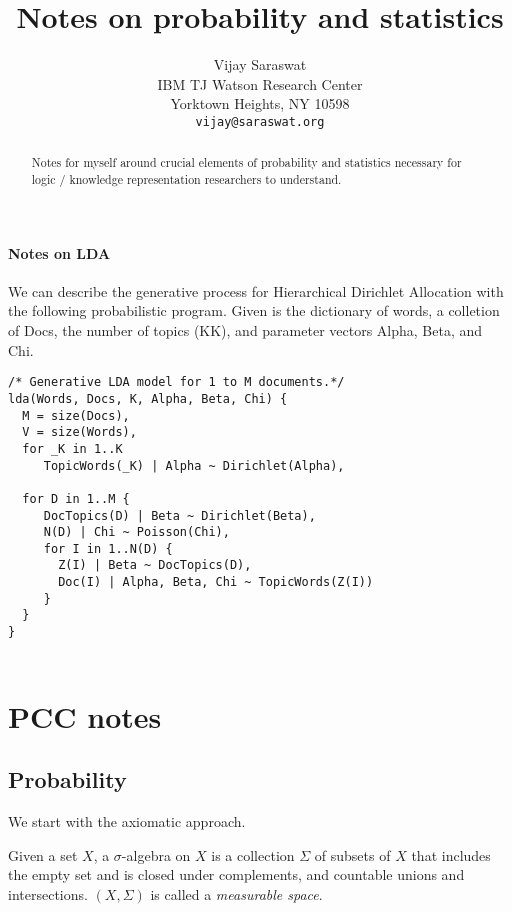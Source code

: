 \documentclass{article}
\title{Notes on probability and statistics}
\author{
  Vijay Saraswat \\
  IBM TJ Watson Research Center \\
  Yorktown Heights, NY 10598\\
  \texttt{vijay@saraswat.org} 
}
\begin{document}

\maketitle
\begin{abstract}
  Notes for myself around crucial elements of probability and statistics necessary for logic / knowledge representation researchers to understand.
\end{abstract}

\paragraph{Notes on LDA}

We can describe the generative process for Hierarchical Dirichlet Allocation with the following probabilistic program. Given is the dictionary of words, a colletion of Docs, the number of topics (KK), and parameter vectors Alpha, Beta, and Chi.  

\begin{lstlisting}
/* Generative LDA model for 1 to M documents.*/
lda(Words, Docs, K, Alpha, Beta, Chi) {
  M = size(Docs),
  V = size(Words),
  for _K in 1..K
     TopicWords(_K) | Alpha ~ Dirichlet(Alpha),

  for D in 1..M {
     DocTopics(D) | Beta ~ Dirichlet(Beta),
     N(D) | Chi ~ Poisson(Chi),
     for I in 1..N(D) {
       Z(I) | Beta ~ DocTopics(D),
       Doc(I) | Alpha, Beta, Chi ~ TopicWords(Z(I))
     }
  }
}
  
\end{lstlisting}



\section{PCC notes}

\subsection{Probability}

We start with the axiomatic approach.

\begin{definition} Given a set $X$, a $\sigma$-algebra on $X$ is a collection $\Sigma$ of subsets of $X$ that includes the empty set and is closed under complements, and countable unions and intersections. $(X,\Sigma)$ is called a {\em measurable space}.
\end{definition}
\end{document}
